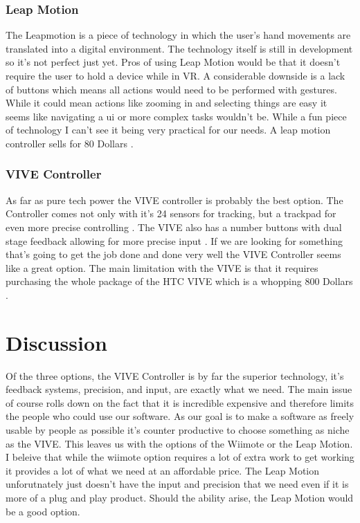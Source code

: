 \documentclass{article}
\begin{document}
\subsubsection{Leap Motion}
The Leapmotion is a piece of technology in which the user's hand movements are translated into a digital environment. 
The technology itself is still in development so it's not perfect just yet.
Pros of using Leap Motion would be that it doesn't require the user to hold a device while in VR.
A considerable downside is a lack of buttons which means all actions would need to be performed with gestures. 
While it could mean actions like zooming in and selecting things are easy it seems like navigating a ui or more complex tasks wouldn't be.
While a fun piece of technology I can't see it being very practical for our needs.
A leap motion controller sells for 80 Dollars \cite{leaphardware}.

\subsubsection{VIVE Controller}
As far as pure tech power the VIVE controller is probably the best option. 
The Controller comes not only with it's 24 sensors for tracking, but a trackpad for even more precise controlling \cite{vivehardware}.
The VIVE also has a number buttons with dual stage feedback allowing for more precise input \cite{vivehardware}.
If we are looking for something that's going to get the job done and done very well the VIVE Controller seems like a great option.
The main limitation with the VIVE is that it requires purchasing the whole package of the HTC VIVE which is a whopping 800 Dollars \cite{vivehardware}.

\section{Discussion}
Of the three options, the VIVE Controller is by far the superior technology, it's feedback systems, precision, and input, are exactly what we need.
The main issue of course rolls down on the fact that it is incredible expensive and therefore limits the people who could use our software.
As our goal is to make a software as freely usable by people as possible it's counter productive to choose something as niche as the VIVE.
This leaves us with the options of the Wiimote or the Leap Motion.
I beleive that while the wiimote option requires a lot of extra work to get working it provides a lot of what we need at an affordable price.
The Leap Motion unforutnately just doesn't have the input and precision that we need even if it is more of a plug and play product.
Should the ability arise, the Leap Motion would be a good option.
\end{document}
